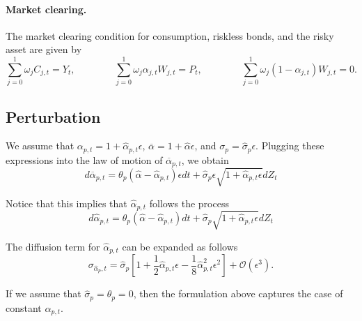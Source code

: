 \paragraph{Market clearing.} The market clearing condition for consumption, riskless bonds, and the risky asset are given by
\begin{equation}
	\sum_{j=0}^1 \omega_j C_{j,t} = Y_t, \qquad \qquad 
	\sum_{j=0}^1 \omega_j \alpha_{j,t} W_{j,t} = P_t, \qquad  \qquad 
	\sum_{j=0}^1 \omega_j (1-\alpha_{j,t}) W_{j,t} = 0.
\end{equation}

\subsection{Perturbation}

We assume that $\alpha_{p,t} = 1 + \hat{\alpha}_{p,t} \epsilon$, $\overline{\alpha} = 1 + \hat{\alpha} \epsilon$, and $\sigma_p = \hat{\sigma}_p \epsilon $. Plugging these expressions into the law of motion of $\overline{\alpha}_{p,t}$, we obtain
\begin{equation}
	d \overline{\alpha}_{p,t}  = \theta_p ( \hat{\alpha} - \hat{\alpha}_{p,t}) \epsilon dt + \hat{\sigma}_p \epsilon \sqrt{1 + \hat{\alpha}_{p,t} \epsilon} d Z_t
\end{equation}

Notice that this implies that $\hat{\alpha}_{p,t}$ follows the process
\begin{equation}
	d \hat{\alpha}_{p,t} = \theta_p ( \hat{\alpha} -\hat{\alpha}_{p,t}) dt + \hat{\sigma}_p \sqrt{1 + \hat{\alpha}_{p,t} \epsilon } d Z_t
\end{equation}

The diffusion term for $\hat{\alpha}_{p,t}$ can be expanded as follows
\begin{equation}
	\sigma_{\hat{\alpha}_p,t} = \hat{\sigma}_p \left[ 1 + \frac{1}{2} \hat{\alpha}_{p,t} \epsilon - \frac{1}{8} \hat{\alpha}_{p,t}^2 \epsilon^2 \right] + \mathcal{O}(\epsilon^3).
\end{equation}


If we assume that $\hat{\sigma}_p = \theta_p = 0$, then the formulation above captures the case of constant $\alpha_{p,t}$. 

